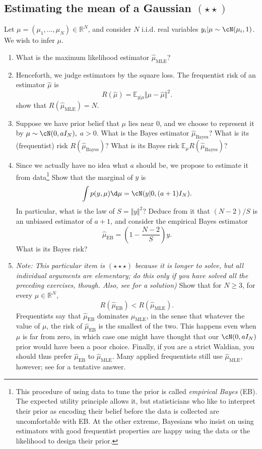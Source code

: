 \documentclass{article}
\begin{document}
 \subsection{Estimating the mean of a Gaussian $(\star\star)$}
 Let $\mu =(\mu_1,\dots,\mu_N)\in \mathbb{R}^N$, and consider $N$ i.i.d. real variables $y_i\vert \mu \sim \cN(\mu_i, 1)$. We wish to infer $\mu$.
\begin{enumerate}
\item What is the maximum likelihood estimator $\hat\mu_{\text{MLE}}$?
\item Henceforth, we judge estimators by the square loss. The frequentist risk of an estimator $\hat\mu$ is
 $$ R(\hat\mu) = \mathbb{E}_{y\vert\mu}  \Vert \mu - \hat\mu\Vert^2.$$
 show that $R(\hat\mu_{\text{MLE}}) = N$.
\item Suppose we have prior belief that $\mu$ lies near $0$, and we choose to represent it by $\mu\sim \cN(0,aI_N),$ $a>0$. What is the Bayes estimator $\hat\mu_{\text{Bayes}}$? What is its (frequentist) risk $R(\hat\mu_{\text{Bayes}})$? What is its Bayes risk $\mathbb{E}_\mu R(\hat\mu_{\text{Bayes}})$?
\item Since we actually have no idea what $a$ should be, we propose to estimate it from data\footnote{This procedure of using data to tune the prior is called \emph{empirical Bayes} (EB). The expected utility principle allows it, but statisticians who like to interpret their prior as encoding their belief before the data is collected are uncomfortable with EB. At the other extreme, Bayesians who insist on using estimators with good frequentist properties are happy using the data or the likelihood to design their prior.} Show that the marginal of $y$ is
$$
\int p(y,\mu)\d \mu = \cN (y\vert 0,(a+1)I_N).
$$
In particular, what is the law of $S= \Vert y\Vert^2$? Deduce from it that $(N-2)/S$ is an unbiased estimator of $a+1$, and consider the empirical Bayes estimator $$\hat\mu_\text{EB} = \left(1- \frac{N-2}{S}\right)y.$$
What is its Bayes risk?
\item \emph{Note: This particular item is $(\star\star\star)$ because it is longer to solve, but all individual arguments are elementary; do this only if you have solved all the preceding exercises, though. Also, see \cite[Section 1.2]{Efr10} for a solution)} Show that for $N\geq 3$, for every $\mu\in\mathbb{R}^N$,
\begin{equation}
R(\hat\mu_\text{EB}) < R(\hat\mu_\text{MLE}).
\label{e:stein}
\end{equation}
Frequentists say that $\hat\mu_\text{EB}$ dominates $\mu_\text{MLE}$, in the sense that whatever the value of $\mu$, the risk of $\hat\mu_\text{EB}$ is the smallest of the two. This happens even when $\mu$ is far from zero, in which case one might have thought that our $\cN(0,aI_N)$ prior would have been a poor choice. Finally, if you are a strict Waldian, you should thus prefer $\hat\mu_\text{EB}$ to $\hat\mu_\text{MLE}$. Many applied frequentists still use $\hat\mu_\text{MLE}$, however; see \citep[Section 1.3]{Efr10} for a tentative answer.


\end{enumerate}
\end{document}
